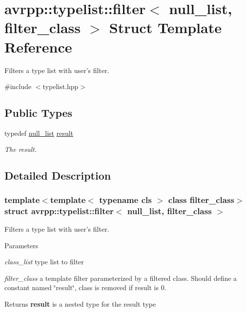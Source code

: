 \hypertarget{structavrpp_1_1typelist_1_1filter_3_01null__list_00_01filter__class_01_4}{
\section{avrpp::typelist::filter$<$ null\_\-list, filter\_\-class $>$ Struct Template Reference}
\label{structavrpp_1_1typelist_1_1filter_3_01null__list_00_01filter__class_01_4}
}


Filters a type list with user's filter.  




{\ttfamily \#include $<$typelist.hpp$>$}

\subsection*{Public Types}
\begin{DoxyCompactItemize}
\item 
typedef \hyperlink{structavrpp_1_1typelist_1_1null__list}{null\_\-list} \hyperlink{structavrpp_1_1typelist_1_1filter_3_01null__list_00_01filter__class_01_4_a04b3cd15c5ec2e7efbc62e45e67b905e}{result}
\begin{DoxyCompactList}\small\item\em The result. \item\end{DoxyCompactList}\end{DoxyCompactItemize}


\subsection{Detailed Description}
\subsubsection*{template$<$template$<$ typename cls $>$ class filter\_\-class$>$ struct avrpp::typelist::filter$<$ null\_\-list, filter\_\-class $>$}

Filters a type list with user's filter. 
\begin{DoxyParams}{Parameters}
\item[{\em class\_\-list}]type list to filter \item[{\em filter\_\-class}]a template filter parameterized by a filtered class. Should define a constant named \char`\"{}result\char`\"{}, class is removed if result is 0. \end{DoxyParams}
\begin{DoxyReturn}{Returns}
{\bfseries result} is a nested type for the result type 
\end{DoxyReturn}


